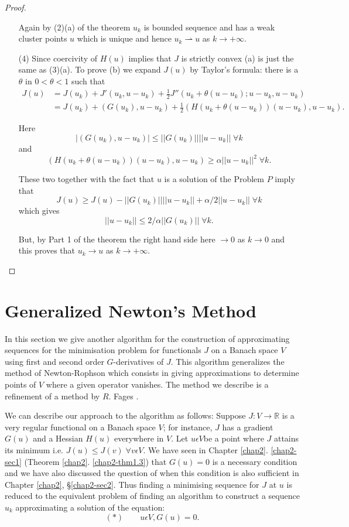 \begin{proof}
\begin{enumerate}
Again by (2)(a) of the theorem $u_{k}$ is bounded sequence and has a weak cluster points $u$ which is unique and hence $u_{k} \rightharpoonup u$ as $k \to + \infty$.

\item[(4)] Since coercivity of $H(u)$ implies that $J$ is strictly convex (a) is just the same as (3)(a). To prove (b) we expand $J(u)$ by Taylor's formula: there is a $\theta$ in $0 < \theta < 1$ such that
\begin{align*}
J(u) & = J(u_{k}) + J'(u_{k}, u-u_{k}) + \frac{1}{2} J''(u_{k} + \theta (u- u_{k}); u -u_{k}, u-u_{k})\\
& = J(u_{k}) + (G(u_{k}), u-u_{k}) + \frac{1}{2} (H(u_{k} + \theta(u-u_{k}))(u-u_{k}), u-u_{k}).
\end{align*}\pageoriginale

Here
$$
|(G(u_{k}), u-u_{k})| \leq ||G(u_{k})|| ||u-u_{k}|| \; \forall k
$$
and
$$
(H(u_{k} + \theta(u-u_{k}))(u-u_{k}), u-u_{k}) \geq \alpha ||u-u_{k}||^{2} \; \forall k.
$$

These two together with the fact that $u$ is a solution of the Problem $P$ imply that
$$
J(u) \geq J(u) - ||G(u_{k})|| ||u-u_{k}|| + \alpha/2 ||u-u_{k}|| \; \forall k
$$
which gives
$$
||u-u_{k}|| \leq 2/\alpha ||G(u_{k})|| \; \forall k.
$$

But, by Part 1 of the theorem the right hand side here $\to 0$ as $k \to 0$ and this proves that $u_{k} \to u$ as $k \to + \infty$.
\end{enumerate}
\end{proof}

\section{Generalized Newton's Method}\label{chap3-sec2}

In this section we give another algorithm for the construction of approximating sequences for the minimisation problem for functionals $J$ on a Banach space $V$ using first and second order $G$-derivatives of $J$. This algorithm generalizes the method of Newton-Rophson which consists in giving approximations to determine points of $V$ where a given operator vanishes. The method we describe is a refinement of a method by $R$. Fages \cite{key54}.

We can describe our approach to the algorithm as follows:
Suppose $J : V \to \mathbb{R}$ is a very regular functional on a Banach space $V$; for instance, $J$ has a gradient $G(u)$ and a Hessian $H(u)$ everywhere in $V$. Let $u \epsilon V$\pageoriginale be a point where $J$ attains its minimum i.e. $J(u) \leq J(v) \; \forall v \epsilon V$. We have seen in Chapter \ref{chap2}. \ref{chap2-sec1} (Theorem \ref{chap2}. \ref{chap2-thm1.3}) that $G(u) = 0$ is a necessary condition and we have also discussed the question of when this condition is also sufficient in Chapter \ref{chap2}, \S \ref{chap2-sec2}. Thus finding a minimising sequence for $J$ at $u$ is reduced to the equivalent problem of finding an algorithm to construct a sequence $u_{k}$ approximating a solution of the equation:
$$
(*)\qquad u \epsilon V, G(u) = 0.
$$

